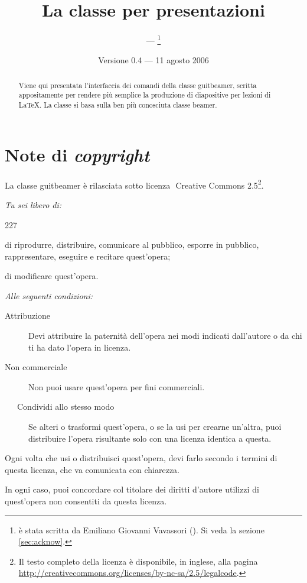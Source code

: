\documentclass[a4paper,10pt]{article}
\title{La classe per presentazioni \pkg{guitbeamer}}
\author{{\LARGE\GuIT} --- \GuITtext\thanks{\cls{guitbeamer} \`e stata
scritta da Emiliano Giovanni Vavassori
(\email{testina@sssup.it}). Si veda
la sezione \ref{sec:acknow}.}}
\date{Versione 0.4 --- 11 agosto 2006}
\newcommand{\pkg}[1]{\textsf{#1}}
\let\cls\pkg
\begin{document}
\maketitle

\begin{abstract}
Viene qui presentata l'interfaccia dei comandi della classe
\cls{guitbeamer}, scritta appositamente per rendere più semplice la
produzione di diapositive per lezioni di \LaTeX. La classe si basa
sulla ben più conosciuta classe \cls{beamer}.
\end{abstract}

\tableofcontents
\newpage
\section*{Note di \textit{copyright}}
La classe \cls{guitbeamer} è rilasciata sotto licenza
$\!$\cc$\!\!\!\!$ Creative Commons 2.5\footnote{Il testo completo
della licenza è disponibile, in inglese, alla pagina
\url{http://creativecommons.org/licenses/by-nc-sa/2.5/legalcode}.}.

\noindent\emph{Tu sei libero di:}
\begin{dinglist}{227}
    \item di riprodurre, distribuire, comunicare al pubblico, esporre
	in pubblico, rappresentare, eseguire e recitare quest'opera;
    \item di modificare quest'opera.
\end{dinglist}

\noindent\emph{Alle seguenti condizioni:}
\begin{description}
    \item[\ccby Attribuzione]Devi attribuire la paternità dell'opera
	nei modi indicati dall'autore o da chi ti ha dato l'opera in
	licenza.
    \item[\ccnc Non commerciale]Non puoi usare
	quest'opera per fini commerciali.
    \item[\ \ccsa\ \ $\!\!$Condividi allo stesso modo]Se alteri o
	trasformi quest'opera, o se la usi per crearne un'altra, puoi
	distribuire l'opera risultante solo con una licenza identica a
	questa.
\end{description}

\begin{dinglist}{52}
    \item Ogni volta che usi o distribuisci quest'opera, devi farlo
	secondo i termini di questa licenza, che va comunicata con
	chiarezza.
    \item In ogni caso, puoi concordare col titolare dei diritti
	d'autore utilizzi di quest'opera non consentiti da questa
	licenza.
\end{dinglist}
\end{document}
